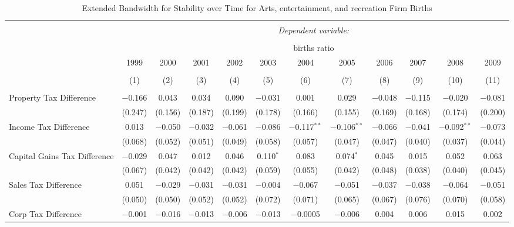 
\begin{table}[!htbp] \centering 
  \caption{Extended Bandwidth for Stability over Time for  Arts, entertainment, and recreation Firm Births} 
  \label{} 
\begin{tabular}{@{\extracolsep{5pt}}lccccccccccc} 
\\[-1.8ex]\hline 
\hline \\[-1.8ex] 
 & \multicolumn{11}{c}{\textit{Dependent variable:}} \\ 
\cline{2-12} 
\\[-1.8ex] & \multicolumn{11}{c}{births ratio} \\ 
 & 1999 & 2000 & 2001 & 2002 & 2003 & 2004 & 2005 & 2006 & 2007 & 2008 & 2009 \\ 
\\[-1.8ex] & (1) & (2) & (3) & (4) & (5) & (6) & (7) & (8) & (9) & (10) & (11)\\ 
\hline \\[-1.8ex] 
 Property Tax Difference & $-$0.166 & 0.043 & 0.034 & 0.090 & $-$0.031 & 0.001 & 0.029 & $-$0.048 & $-$0.115 & $-$0.020 & $-$0.081 \\ 
  & (0.247) & (0.156) & (0.187) & (0.199) & (0.178) & (0.166) & (0.155) & (0.169) & (0.168) & (0.174) & (0.200) \\ 
  Income Tax Difference & 0.013 & $-$0.050 & $-$0.032 & $-$0.061 & $-$0.086 & $-$0.117$^{**}$ & $-$0.106$^{**}$ & $-$0.066 & $-$0.041 & $-$0.092$^{**}$ & $-$0.073 \\ 
  & (0.068) & (0.052) & (0.051) & (0.049) & (0.058) & (0.057) & (0.047) & (0.047) & (0.040) & (0.037) & (0.044) \\ 
  Capital Gains Tax Difference & $-$0.029 & 0.047 & 0.012 & 0.046 & 0.110$^{*}$ & 0.083 & 0.074$^{*}$ & 0.045 & 0.015 & 0.052 & 0.063 \\ 
  & (0.067) & (0.042) & (0.042) & (0.042) & (0.059) & (0.055) & (0.042) & (0.048) & (0.038) & (0.040) & (0.045) \\ 
  Sales Tax Difference & 0.051 & $-$0.029 & $-$0.031 & $-$0.031 & $-$0.004 & $-$0.067 & $-$0.051 & $-$0.037 & $-$0.038 & $-$0.064 & $-$0.051 \\ 
  & (0.050) & (0.050) & (0.052) & (0.052) & (0.072) & (0.071) & (0.065) & (0.067) & (0.076) & (0.070) & (0.058) \\ 
  Corp Tax Difference & $-$0.001 & $-$0.016 & $-$0.013 & $-$0.006 & $-$0.013 & $-$0.0005 & $-$0.006 & 0.004 & 0.006 & 0.015 & 0.002 \\ 

\end{tabular}
\end{table}
